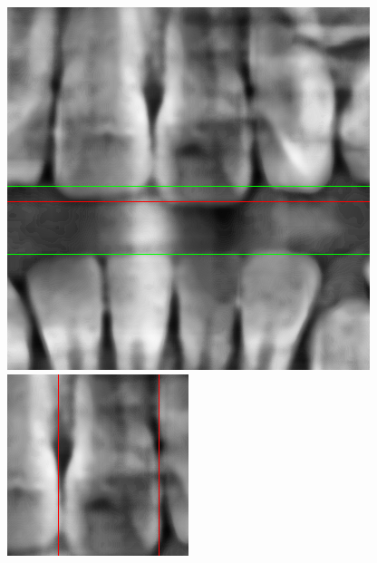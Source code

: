 \documentclass[a4paper,titlepage,12pt]{article}
\begin{document}
\begin{figure}
  \centering
	\begin{minipage}[b]{0.32\linewidth}
		\includegraphics[width=\linewidth]{init/sep.png}
	\end{minipage}
	\begin{minipage}[b]{0.32\linewidth}
		\includegraphics[width=\linewidth]{init/up.png}

\end{minipage}
\end{figure}
\end{document}

